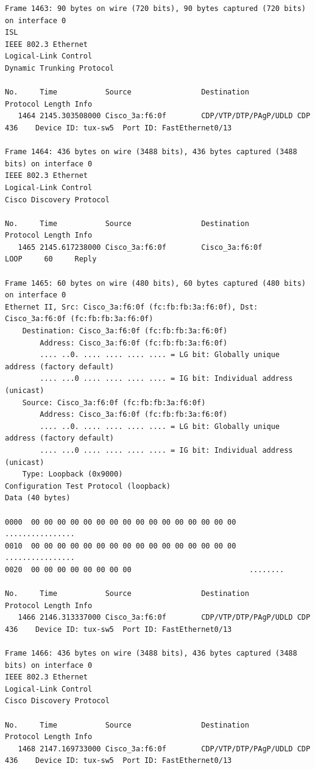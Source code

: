 \documentclass[a4paper,11pt]{article}
\begin{document}
\begin{lstlisting}
Frame 1463: 90 bytes on wire (720 bits), 90 bytes captured (720 bits) on interface 0
ISL
IEEE 802.3 Ethernet 
Logical-Link Control
Dynamic Trunking Protocol

No.     Time           Source                Destination           Protocol Length Info
   1464 2145.303508000 Cisco_3a:f6:0f        CDP/VTP/DTP/PAgP/UDLD CDP      436    Device ID: tux-sw5  Port ID: FastEthernet0/13  

Frame 1464: 436 bytes on wire (3488 bits), 436 bytes captured (3488 bits) on interface 0
IEEE 802.3 Ethernet 
Logical-Link Control
Cisco Discovery Protocol

No.     Time           Source                Destination           Protocol Length Info
   1465 2145.617238000 Cisco_3a:f6:0f        Cisco_3a:f6:0f        LOOP     60     Reply

Frame 1465: 60 bytes on wire (480 bits), 60 bytes captured (480 bits) on interface 0
Ethernet II, Src: Cisco_3a:f6:0f (fc:fb:fb:3a:f6:0f), Dst: Cisco_3a:f6:0f (fc:fb:fb:3a:f6:0f)
    Destination: Cisco_3a:f6:0f (fc:fb:fb:3a:f6:0f)
        Address: Cisco_3a:f6:0f (fc:fb:fb:3a:f6:0f)
        .... ..0. .... .... .... .... = LG bit: Globally unique address (factory default)
        .... ...0 .... .... .... .... = IG bit: Individual address (unicast)
    Source: Cisco_3a:f6:0f (fc:fb:fb:3a:f6:0f)
        Address: Cisco_3a:f6:0f (fc:fb:fb:3a:f6:0f)
        .... ..0. .... .... .... .... = LG bit: Globally unique address (factory default)
        .... ...0 .... .... .... .... = IG bit: Individual address (unicast)
    Type: Loopback (0x9000)
Configuration Test Protocol (loopback)
Data (40 bytes)

0000  00 00 00 00 00 00 00 00 00 00 00 00 00 00 00 00   ................
0010  00 00 00 00 00 00 00 00 00 00 00 00 00 00 00 00   ................
0020  00 00 00 00 00 00 00 00                           ........

No.     Time           Source                Destination           Protocol Length Info
   1466 2146.313337000 Cisco_3a:f6:0f        CDP/VTP/DTP/PAgP/UDLD CDP      436    Device ID: tux-sw5  Port ID: FastEthernet0/13  

Frame 1466: 436 bytes on wire (3488 bits), 436 bytes captured (3488 bits) on interface 0
IEEE 802.3 Ethernet 
Logical-Link Control
Cisco Discovery Protocol

No.     Time           Source                Destination           Protocol Length Info
   1468 2147.169733000 Cisco_3a:f6:0f        CDP/VTP/DTP/PAgP/UDLD CDP      436    Device ID: tux-sw5  Port ID: FastEthernet0/13  


\end{lstlisting}
\end{document}
